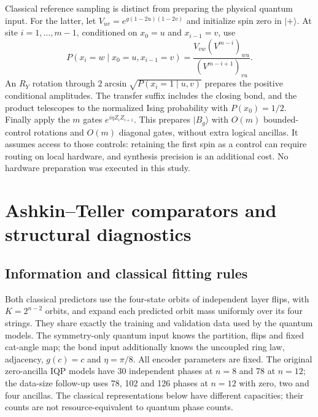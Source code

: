 Classical reference sampling is distinct from preparing the physical quantum input. For the latter, let $V_{uv}=e^{g(1-2u)(1-2v)}$ and initialize spin zero in $|+\rangle$. At site $i=1,\ldots,m-1$, conditioned on $x_0=u$ and $x_{i-1}=v$, use
\begin{equation}
 P(x_i=w\mid x_0=u,x_{i-1}=v)
 =\frac{V_{vw}(V^{m-i})_{wu}}{(V^{m-i+1})_{vu}}.
\end{equation}
An $R_Y$ rotation through $2\arcsin\sqrt{P(x_i=1\mid u,v)}$ prepares the positive conditional amplitudes. The transfer suffix includes the closing bond, and the product telescopes to the normalized Ising probability with $P(x_0)=1/2$. Finally apply the $m$ gates $e^{i\eta Z_iZ_{i+1}}$. This prepares $|B_g\rangle$ with $O(m)$ bounded-control rotations and $O(m)$ diagonal gates, without extra logical ancillas. It assumes access to those controls: retaining the first spin as a control can require routing on local hardware, and synthesis precision is an additional cost. No hardware preparation was executed in this study.

\section{Ashkin--Teller comparators and structural diagnostics}
\subsection{Information and classical fitting rules}
\label{app:at-comparators}

Both classical predictors use the four-state orbits of independent layer flips, with $K=2^{n-2}$ orbits, and expand each predicted orbit mass uniformly over its four strings. They share exactly the training and validation data used by the quantum models. The symmetry-only quantum input knows the partition, flips and fixed cat-angle map; the bond input additionally knows the uncoupled ring law, adjacency, $g(c)=c$ and $\eta=\pi/8$. All encoder parameters are fixed. The original zero-ancilla IQP models have 30 independent phases at $n=8$ and 78 at $n=12$; the data-size follow-up uses 78, 102 and 126 phases at $n=12$ with zero, two and four ancillas. The classical representations below have different capacities; their counts are not resource-equivalent to quantum phase counts.

